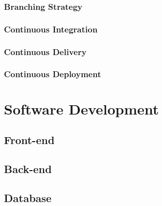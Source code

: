\documentclass{article}
\begin{document}
        \subsubsection{Branching Strategy}

        \subsubsection{Continuous Integration}

        \subsubsection{Continuous Delivery}

        \subsubsection{Continuous Deployment}

\pagebreak

\section{Software Development} 

    \subsection{Front-end}

    \subsection{Back-end}

    \subsection{Database}
\end{document}
